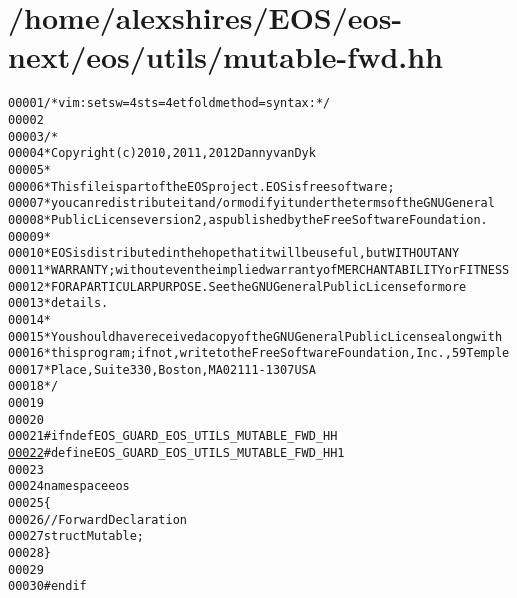 \hypertarget{mutable-fwd_8hh_source}{
\section{/home/alexshires/EOS/eos-\/next/eos/utils/mutable-\/fwd.hh}
}


\begin{footnotesize}\begin{alltt}
00001 \textcolor{comment}{/* vim: set sw=4 sts=4 et foldmethod=syntax : */}
00002 
00003 \textcolor{comment}{/*}
00004 \textcolor{comment}{ * Copyright (c) 2010, 2011, 2012 Danny van Dyk}
00005 \textcolor{comment}{ *}
00006 \textcolor{comment}{ * This file is part of the EOS project. EOS is free software;}
00007 \textcolor{comment}{ * you can redistribute it and/or modify it under the terms of the GNU General}
00008 \textcolor{comment}{ * Public License version 2, as published by the Free Software Foundation.}
00009 \textcolor{comment}{ *}
00010 \textcolor{comment}{ * EOS is distributed in the hope that it will be useful, but WITHOUT ANY}
00011 \textcolor{comment}{ * WARRANTY; without even the implied warranty of MERCHANTABILITY or FITNESS}
00012 \textcolor{comment}{ * FOR A PARTICULAR PURPOSE.  See the GNU General Public License for more}
00013 \textcolor{comment}{ * details.}
00014 \textcolor{comment}{ *}
00015 \textcolor{comment}{ * You should have received a copy of the GNU General Public License along with}
00016 \textcolor{comment}{ * this program; if not, write to the Free Software Foundation, Inc., 59 Temple}
00017 \textcolor{comment}{ * Place, Suite 330, Boston, MA  02111-1307  USA}
00018 \textcolor{comment}{ */}
00019 
00020 
00021 \textcolor{preprocessor}{#ifndef EOS\_GUARD\_EOS\_UTILS\_MUTABLE\_FWD\_HH}
\hypertarget{mutable-fwd_8hh_source_l00022}{}\hyperlink{mutable-fwd_8hh_a45798574987d1ebba9dfcb0b036e02ee}{00022} \textcolor{preprocessor}{}\textcolor{preprocessor}{#define EOS\_GUARD\_EOS\_UTILS\_MUTABLE\_FWD\_HH 1}
00023 \textcolor{preprocessor}{}
00024 \textcolor{keyword}{namespace }eos
00025 \{
00026     \textcolor{comment}{// Forward Declaration}
00027     \textcolor{keyword}{struct }Mutable;
00028 \}
00029 
00030 \textcolor{preprocessor}{#endif}
\end{alltt}\end{footnotesize}
